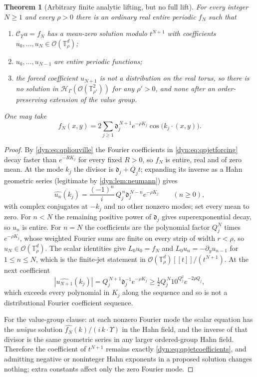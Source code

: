 \documentclass[11pt,letterpaper]{article}
\newtheorem{theorem}{Theorem}[section]
\theoremstyle{definition}
\theoremstyle{remark}
\newcommand{\HH}{\mathscr H}
\newcommand{\OO}{\mathcal O}
\newcommand{\TT}{\mathbb T}
\newcommand{\strip}{\OO(\TT^{d}_{\rho})}
\newcommand{\Cups}{\mathcal C_{\Upsilon}}
\numberwithin{equation}{section}
\begin{document}
\begin{theorem}[Arbitrary finite analytic lifting, but no full lift]
\label{dyn:thm:qpjet}
For every integer $N\ge1$ and every $\rho>0$ there is an ordinary real
entire periodic $f_N$ such that
\begin{enumerate}[label=(\roman*),leftmargin=*]
\item $\Cups u=f_N$ has a mean-zero solution modulo $t^{N+1}$ with
coefficients $u_0,\dots,u_N\in\strip$;
\item $u_0,\dots,u_{N-1}$ are entire periodic functions;
\item the forced coefficient $u_{N+1}$ is not a distribution on the real
torus, so there is no solution in $\HH_\Gamma(\OO(\TT^{2}_{\rho'}))$ for
any $\rho'>0$, \emph{and none after an order-preserving extension of the
value group}.
\end{enumerate}
One may take
\begin{equation}\label{dyn:eq:qpjetforcing}
 f_N(x,y)=2\sum_{j\ge1}\mathfrak d_j^{\,N+1}e^{-\rho K_j}
 \cos\bigl(k_j\cdot(x,y)\bigr).
\end{equation}
\end{theorem}
\begin{proof}
By \eqref{dyn:eq:qpliouville} the Fourier coefficients in
\eqref{dyn:eq:qpjetforcing} decay faster than $e^{-RK_j}$ for every fixed
$R>0$, so $f_N$ is entire, real and of zero mean. At the mode $k_j$ the
divisor is $\mathfrak d_j+Q_jt$; expanding its inverse as a Hahn geometric
series (legitimate by \cref{dyn:lem:neumann}) gives
\begin{equation}\label{dyn:eq:qpjetcoefficients}
 \widehat{u_n}(k_j)=\frac{(-1)^{n}}{i}\,
 Q_j^{\,n}\mathfrak d_j^{\,N-n}e^{-\rho K_j}\qquad(n\ge0),
\end{equation}
with complex conjugates at $-k_j$ and no other nonzero modes; set every
mean to zero. For $n<N$ the remaining positive power of $\mathfrak d_j$
gives superexponential decay, so $u_n$ is entire. For $n=N$ the
coefficients are the polynomial factor $Q_j^{N}$ times $e^{-\rho K_j}$,
whose weighted Fourier sums are finite on every strip of width $r<\rho$, so
$u_N\in\strip$. The scalar identities give $L_0u_0=f_N$ and
$L_0u_n=-\partial_yu_{n-1}$ for $1\le n\le N$, which is the finite-jet
statement in $\strip[[t]]/(t^{N+1})$. At the next coefficient
\[
 |\widehat{u_{N+1}}(k_j)|
 =Q_j^{\,N+1}\mathfrak d_j^{-1}e^{-\rho K_j}
 \ge\tfrac12Q_j^{\,N}10^{Q_j^{2}}e^{-2\rho Q_j},
\]
which exceeds every polynomial in $K_j$ along the sequence and so is not a
distributional Fourier coefficient sequence.

For the value-group clause: at each nonzero Fourier mode the scalar
equation has the \emph{unique} solution
$\widehat{f_N}(k)/(i\,k\cdot\Upsilon)$ in the Hahn field, and the inverse
of that divisor is the same geometric series in any larger ordered-group
Hahn field. Therefore the coefficient of $t^{N+1}$ remains exactly
\eqref{dyn:eq:qpjetcoefficients}, and admitting negative or noninteger Hahn
exponents in a proposed solution changes nothing; extra constants affect
only the zero Fourier mode.
\end{proof}
\end{document}
